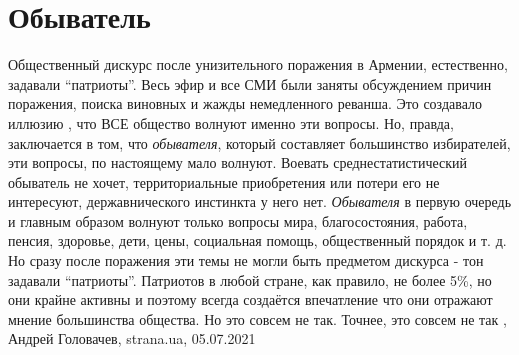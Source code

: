  
 
 
 
 
\chapter{Обыватель}
\label{sec:slova.obyvatel}

Общественный дискурс после унизительного поражения в Армении, естественно,
задавали \enquote{патриоты}. Весь эфир и все СМИ были заняты обсуждением причин
поражения, поиска виновных и жажды немедленного реванша. Это создавало иллюзию
, что ВСЕ общество волнуют именно эти вопросы. Но, правда, заключается в том,
что \emph{обывателя}, который составляет большинство избирателей, эти вопросы, по
настоящему мало волнуют. Воевать среднестатистический обыватель не хочет,
территориальные приобретения или потери его не интересуют, державнического
инстинкта у него нет. \emph{Обывателя} в первую очередь и главным образом волнуют
только вопросы мира, благосостояния, работа, пенсия, здоровье, дети, цены,
социальная помощь, общественный порядок и т. д. Но сразу после поражения эти
темы не могли быть предметом дискурса - тон задавали \enquote{патриоты}. Патриотов в
любой стране, как правило, не более 5\%, но они крайне активны и поэтому
всегда создаётся впечатление что они отражают мнение большинства общества. Но
это совсем не так. Точнее, это совсем не так
, 
Андрей Головачев, strana.ua, 05.07.2021

